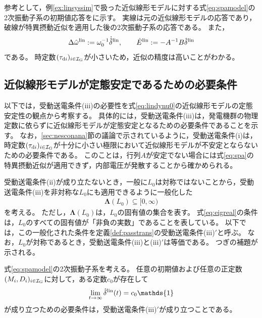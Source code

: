 \documentclass[tombow,dvipdfmx]{corona-a5-1.1}
\begin{document}
参考として，例\ref{ex:linsyssim}で扱った近似線形モデルに対する式\ref{eq:spamodel}の2次振動子系の初期値応答をに示す。
実線は元の近似線形モデルの応答であり，破線が特異摂動近似を適用した後の2次振動子系の応答である。
また，
\[\Delta \hat{\omega}^{\rm lin}:=\omega_0^{-1} \dot{\hat{\delta}}^{\rm lin},\qquad
\hat{E}^{\rm lin}:=-A^{-1}B\hat{\delta}^{\rm lin}
\]
である。
時定数$(\tau_{{\rm d}i})_{i \in \mathcal{I}_{\rm G}}$が小さいため，近似の精度は高いことがわかる。

\subsection{近似線形モデルが定態安定であるための必要条件\advanced}\label{sec:nesconsta}

以下では，受動送電条件(iii)の必要性を式\ref{eq:lindynu0}の近似線形モデルの定態安定性の観点から考察する。
具体的には，受動送電条件(iii)は，発電機群の物理定数に依らずに近似線形モデルが定態安定となるための必要条件であることを示す。
なお，\ref{sec:nesconana}節の議論で示されているように，受動送電条件(i)は，時定数$(\tau_{{\rm d}i})_{i \in \mathcal{I}_{\rm G}}$が十分に小さい極限において近似線形モデルが不安定とならないための必要条件である。
このことは，行列$A$が安定でない場合には式\ref{eq:spa}の特異摂動近似が適用できず，内部電圧が発散することから確かめられる。



受動送電条件(ii)が成り立たないとき，一般に$L_0$は対称ではないことから，受動送電条件(iii)を非対称な$L_0$にも適用できるように一般化した
\begin{align}\label{eq:eigreal}
\bm{\Lambda}(L_0)\subseteq [0,\infty)
\end{align}
を考える。
ただし，$\bm{\Lambda}(L_0)$は，$L_0$の固有値の集合を表す。
式\ref{eq:eigreal}の条件は，$L_0$のすべての固有値が「非負の実数」であることを表している。
以下では，この一般化された条件を定義\ref{def:passtrans}の受動送電条件(iii)$'$と呼ぶ。
なお，$L_0$が対称であるとき，受動送電条件(iii)と(iii)$'$は等価である。
つぎの補題が示される。

\begin{補題}[2次振動子系の定態安定性の必要条件]\label{thm:2ndsys}
式\ref{eq:spamodel}の2次振動子系を考える。
任意の初期値および任意の正定数$(M_i,D_i)_{i \in \mathcal{I}_{\rm G}}$に対して，ある定数$c_0$が存在して
\begin{align}\label{eq:delhat0}
\lim_{t\rightarrow \infty} \hat{\delta}^{\rm lin}(t)= c_0 \mathds{1}
\end{align}
が成り立つための必要条件は，受動送電条件(iii)$'$が成り立つことである。
\end{補題}
\end{document}
